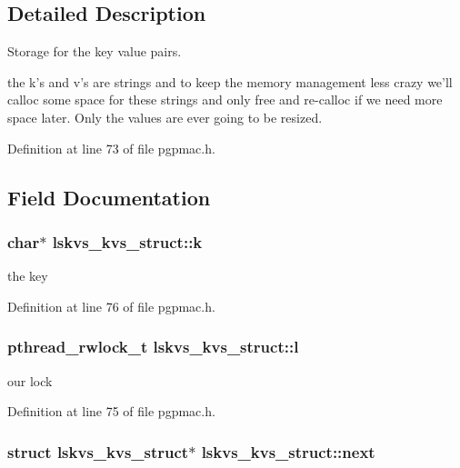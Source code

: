 \subsection{Detailed Description}
Storage for the key value pairs. 

the k's and v's are strings and to keep the memory management less crazy we'll calloc some space for these strings and only free and re-\/calloc if we need more space later. Only the values are ever going to be resized. 

Definition at line 73 of file pgpmac.\-h.



\subsection{Field Documentation}
\hypertarget{structlskvs__kvs__struct_afaaab7729ce9dbabd8f3e2c502a8e4c5}{
\subsubsection[{k}]{\setlength{\rightskip}{0pt plus 5cm}char$\ast$ lskvs\-\_\-kvs\-\_\-struct\-::k}}\label{structlskvs__kvs__struct_afaaab7729ce9dbabd8f3e2c502a8e4c5}


the key 



Definition at line 76 of file pgpmac.\-h.

\hypertarget{structlskvs__kvs__struct_a45129c7f3d0bb2efc83b8a0d7ea2d814}{
\subsubsection[{l}]{\setlength{\rightskip}{0pt plus 5cm}pthread\-\_\-rwlock\-\_\-t lskvs\-\_\-kvs\-\_\-struct\-::l}}\label{structlskvs__kvs__struct_a45129c7f3d0bb2efc83b8a0d7ea2d814}


our lock 



Definition at line 75 of file pgpmac.\-h.

\hypertarget{structlskvs__kvs__struct_a6302f184418962708bd1efe3320d4347}{
\subsubsection[{next}]{\setlength{\rightskip}{0pt plus 5cm}struct {\bf lskvs\-\_\-kvs\-\_\-struct}$\ast$ lskvs\-\_\-kvs\-\_\-struct\-::next}}\label{structlskvs__kvs__struct_a6302f184418962708bd1efe3320d4347}


